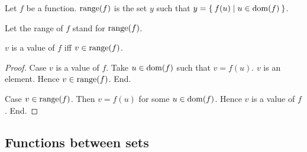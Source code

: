 \documentclass[../../set-theory.ftl.tex]{subfiles}
\begin{document}
  \begin{forthel}
    \begin{definition}
      Let $f$ be a function.
      $\operatorname{range}(f)$ is the set $y$ such that $y = \Set{f(u) | u \in \operatorname{dom}(f)}$.
    \end{definition}

    Let the range of $f$ stand for $\operatorname{range}(f)$.


    \begin{proposition}\label{SetTheory_02_01_324423}
      $v$ is a value of $f$ iff $v \in \operatorname{range}(f)$.
    \end{proposition}
    \begin{proof}
      Case $v$ is a value of $f$.
        Take $u \in \operatorname{dom}(f)$ such that $v = f(u)$.
        $v$ is an element.
        Hence $v \in \operatorname{range}(f)$.
      End.

      Case $v \in \operatorname{range}(f)$.
        Then $v = f(u)$ for some $u \in \operatorname{dom}(f)$.
        Hence $v$ is a value of $f$.
      End.
    \end{proof}
  \end{forthel}


  \subsection{Functions between sets}
\end{document}
